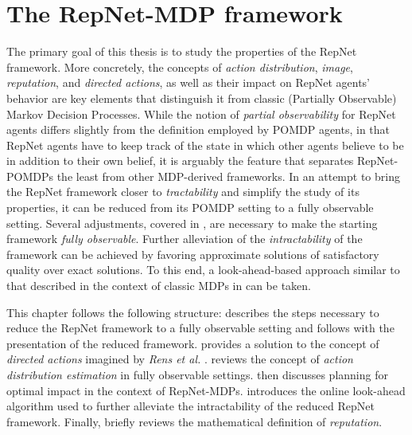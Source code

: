 
\chapter{The RepNet-MDP framework}
\label{chap:mdp}
The primary goal of this thesis is to study the properties of the RepNet framework. More concretely, the concepts of \textit{action distribution}, \textit{image}, \textit{reputation}, and \textit{directed actions}, as well as their impact on RepNet agents' behavior are key elements that distinguish it from classic (Partially Observable) Markov Decision Processes. While the notion of \textit{partial observability} for RepNet agents differs slightly from the definition employed by POMDP agents, in that RepNet agents have to keep track of the state in which other agents believe to be in addition to their own belief, it is arguably the feature that separates RepNet-POMDPs the least from other MDP-derived frameworks. In an attempt to bring the RepNet framework closer to \textit{tractability} and simplify the study of its properties, it can be reduced from its POMDP setting to a fully observable setting. Several adjustments, covered in , are necessary to make the starting framework \textit{fully observable}. 
Further alleviation of the \textit{intractability} of the framework can be achieved by favoring approximate solutions of satisfactory quality over exact solutions. To this end, a look-ahead-based approach similar to that described in the context of classic MDPs in  can be taken.

This chapter follows the following structure:  describes the steps necessary to reduce the RepNet framework to a fully observable setting and follows with the presentation of the reduced framework.  provides a solution to the concept of \textit{directed actions} imagined by \textit{Rens et al.} \cite{rensetal}.  reviews the concept of \textit{action distribution estimation} in fully observable settings.  then discusses planning for optimal impact in the context of RepNet-MDPs.  introduces the online look-ahead algorithm used to further alleviate the intractability of the reduced RepNet framework. Finally,  briefly reviews the mathematical definition of \textit{reputation}.




